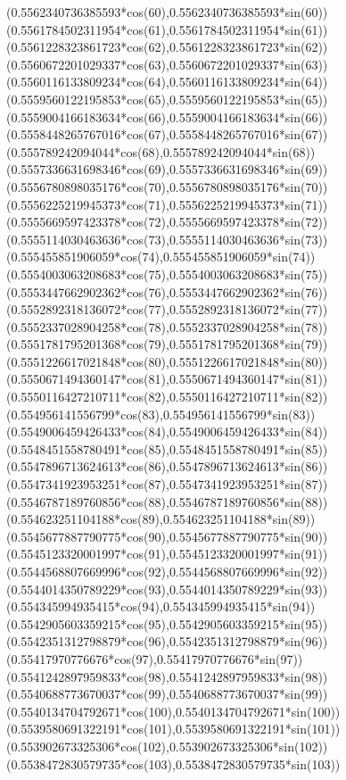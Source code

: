 {({0.5562340736385593*cos(60)},{0.5562340736385593*sin(60)})
({0.5561784502311954*cos(61)},{0.5561784502311954*sin(61)})
({0.5561228323861723*cos(62)},{0.5561228323861723*sin(62)})
({0.5560672201029337*cos(63)},{0.5560672201029337*sin(63)})
({0.5560116133809234*cos(64)},{0.5560116133809234*sin(64)})
({0.5559560122195853*cos(65)},{0.5559560122195853*sin(65)})
({0.5559004166183634*cos(66)},{0.5559004166183634*sin(66)})
({0.5558448265767016*cos(67)},{0.5558448265767016*sin(67)})
({0.555789242094044*cos(68)},{0.555789242094044*sin(68)})
({0.5557336631698346*cos(69)},{0.5557336631698346*sin(69)})
({0.5556780898035176*cos(70)},{0.5556780898035176*sin(70)})
({0.5556225219945373*cos(71)},{0.5556225219945373*sin(71)})
({0.5555669597423378*cos(72)},{0.5555669597423378*sin(72)})
({0.5555114030463636*cos(73)},{0.5555114030463636*sin(73)})
({0.555455851906059*cos(74)},{0.555455851906059*sin(74)})
({0.5554003063208683*cos(75)},{0.5554003063208683*sin(75)})
({0.5553447662902362*cos(76)},{0.5553447662902362*sin(76)})
({0.5552892318136072*cos(77)},{0.5552892318136072*sin(77)})
({0.5552337028904258*cos(78)},{0.5552337028904258*sin(78)})
({0.5551781795201368*cos(79)},{0.5551781795201368*sin(79)})
({0.5551226617021848*cos(80)},{0.5551226617021848*sin(80)})
({0.5550671494360147*cos(81)},{0.5550671494360147*sin(81)})
({0.5550116427210711*cos(82)},{0.5550116427210711*sin(82)})
({0.554956141556799*cos(83)},{0.554956141556799*sin(83)})
({0.5549006459426433*cos(84)},{0.5549006459426433*sin(84)})
({0.5548451558780491*cos(85)},{0.5548451558780491*sin(85)})
({0.5547896713624613*cos(86)},{0.5547896713624613*sin(86)})
({0.5547341923953251*cos(87)},{0.5547341923953251*sin(87)})
({0.5546787189760856*cos(88)},{0.5546787189760856*sin(88)})
({0.554623251104188*cos(89)},{0.554623251104188*sin(89)})
({0.5545677887790775*cos(90)},{0.5545677887790775*sin(90)})
({0.5545123320001997*cos(91)},{0.5545123320001997*sin(91)})
({0.5544568807669996*cos(92)},{0.5544568807669996*sin(92)})
({0.5544014350789229*cos(93)},{0.5544014350789229*sin(93)})
({0.554345994935415*cos(94)},{0.554345994935415*sin(94)})
({0.5542905603359215*cos(95)},{0.5542905603359215*sin(95)})
({0.5542351312798879*cos(96)},{0.5542351312798879*sin(96)})
({0.55417970776676*cos(97)},{0.55417970776676*sin(97)})
({0.5541242897959833*cos(98)},{0.5541242897959833*sin(98)})
({0.5540688773670037*cos(99)},{0.5540688773670037*sin(99)})
({0.5540134704792671*cos(100)},{0.5540134704792671*sin(100)})
({0.5539580691322191*cos(101)},{0.5539580691322191*sin(101)})
({0.553902673325306*cos(102)},{0.553902673325306*sin(102)})
({0.5538472830579735*cos(103)},{0.5538472830579735*sin(103)})
}
